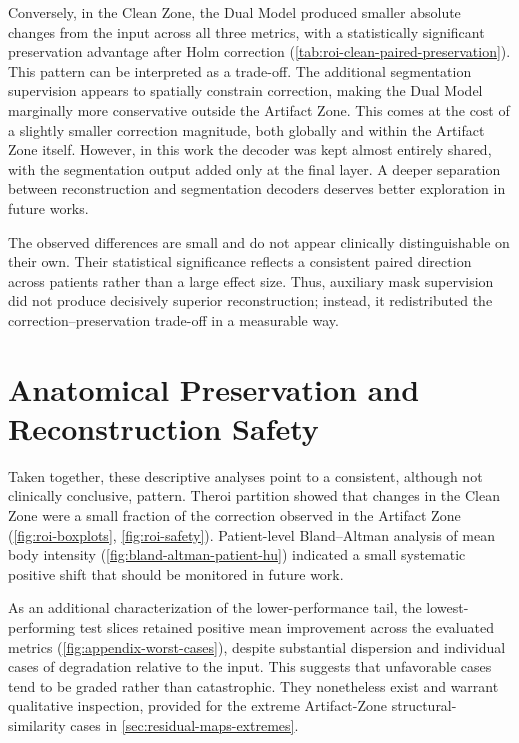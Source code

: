 Conversely, in the Clean Zone, the Dual Model produced smaller absolute changes from the input across all three metrics, with a statistically significant preservation advantage after Holm correction (\autoref{tab:roi-clean-paired-preservation}). This pattern can be interpreted as a trade-off. The additional segmentation supervision appears to spatially constrain correction, making the Dual Model marginally more conservative outside the Artifact Zone. This comes at the cost of a slightly smaller correction magnitude, both globally and within the Artifact Zone itself. However, in this work the decoder was kept almost entirely shared, with the segmentation output added only at the final layer. A deeper separation between reconstruction and segmentation decoders deserves better exploration in future works.

The observed differences are small and do not appear clinically distinguishable on their own. Their statistical significance reflects a consistent paired direction across patients rather than a large effect size. Thus, auxiliary mask supervision did not produce decisively superior reconstruction; instead, it redistributed the correction--preservation trade-off in a measurable way.
\section{Anatomical Preservation and Reconstruction Safety}

Taken together, these descriptive analyses point to a consistent, although not clinically conclusive, pattern. The\acrshort{roi} partition showed that changes in the Clean Zone were a small fraction of the correction observed in the Artifact Zone (\autoref{fig:roi-boxplots}, \autoref{fig:roi-safety}). Patient-level Bland--Altman analysis of mean body intensity (\autoref{fig:bland-altman-patient-hu}) indicated a small systematic positive shift that should be monitored in future work.

As an additional characterization of the lower-performance tail, the lowest-performing test slices retained positive mean improvement across the evaluated metrics (\autoref{fig:appendix-worst-cases}), despite substantial dispersion and individual cases of degradation relative to the input. This suggests that unfavorable cases tend to be graded rather than catastrophic. They nonetheless exist and warrant qualitative inspection, provided for the extreme Artifact-Zone structural-similarity cases in \autoref{sec:residual-maps-extremes}.


